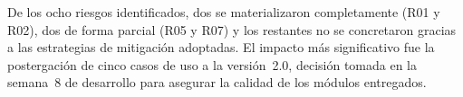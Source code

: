 De los ocho riesgos identificados, dos se materializaron completamente (R01 y R02), dos de forma parcial (R05 y R07) y los restantes no se concretaron gracias a las estrategias de mitigación adoptadas. El impacto más significativo fue la postergación de cinco casos de uso a la versión~2.0, decisión tomada en la semana~8 de desarrollo para asegurar la calidad de los módulos entregados.

